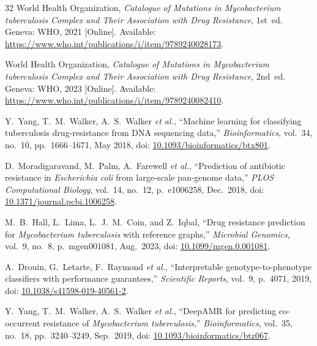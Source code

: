 \documentclass[conference]{IEEEtran}
\begin{document}
\begin{thebibliography}{32}
World Health Organization,
\textit{Catalogue of Mutations in \textit{Mycobacterium tuberculosis}
Complex and Their Association with Drug Resistance}, 1st~ed.
Geneva: WHO, 2021 [Online].
Available: \url{https://www.who.int/publications/i/item/9789240028173}.

World Health Organization,
\textit{Catalogue of Mutations in \textit{Mycobacterium tuberculosis}
Complex and Their Association with Drug Resistance}, 2nd~ed.
Geneva: WHO, 2023 [Online].
Available: \url{https://www.who.int/publications/i/item/9789240082410}.

Y.~Yang, T.~M.~Walker, A.~S.~Walker \textit{et al.},
``Machine learning for classifying tuberculosis drug-resistance from
DNA sequencing data,''
\textit{Bioinformatics}, vol.~34, no.~10, pp.~1666--1671, May 2018,
doi: \href{https://doi.org/10.1093/bioinformatics/btx801}{10.1093/bioinformatics/btx801}.

D.~Moradigaravand, M.~Palm, A.~Farewell \textit{et al.},
``Prediction of antibiotic resistance in \textit{Escherichia coli}
from large-scale pan-genome data,''
\textit{PLOS Computational Biology}, vol.~14, no.~12, p.~e1006258, Dec.\ 2018,
doi: \href{https://doi.org/10.1371/journal.pcbi.1006258}{10.1371/journal.pcbi.1006258}.

M.~B.~Hall, L.~Lima, L.~J.~M.~Coin, and Z.~Iqbal,
``Drug resistance prediction for \textit{Mycobacterium tuberculosis}
with reference graphs,''
\textit{Microbial Genomics}, vol.~9, no.~8, p.~mgen001081, Aug.\ 2023,
doi: \href{https://doi.org/10.1099/mgen.0.001081}{10.1099/mgen.0.001081}.

A.~Drouin, G.~Letarte, F.~Raymond \textit{et al.},
``Interpretable genotype-to-phenotype classifiers with performance
guarantees,''
\textit{Scientific Reports}, vol.~9, p.~4071, 2019,
doi: \href{https://doi.org/10.1038/s41598-019-40561-2}{10.1038/s41598-019-40561-2}.

Y.~Yang, T.~M.~Walker, A.~S.~Walker \textit{et al.},
``DeepAMR for predicting co-occurrent resistance of
\textit{Mycobacterium tuberculosis},''
\textit{Bioinformatics}, vol.~35, no.~18, pp.~3240--3249, Sep.\ 2019,
doi: \href{https://doi.org/10.1093/bioinformatics/btz067}{10.1093/bioinformatics/btz067}.


\end{thebibliography}
\end{document}
